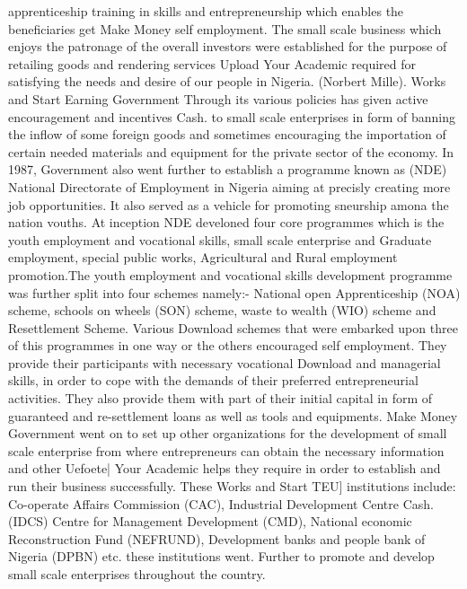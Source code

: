 \documentclass{article}
\begin{document}
apprenticeship training in skills and entrepreneurship which enables the beneficiaries get Make Money
self employment. The small scale business which enjoys the patronage of the overall investors were established for the purpose of retailing goods and rendering services Upload Your Academic
required for satisfying the needs and desire of our people in Nigeria. (Norbert Mille). Works and Start Earning
Government Through its various policies has given active encouragement and incentives Cash.
to small scale enterprises in form of banning the inflow of some foreign goods and
sometimes encouraging the importation of certain needed materials and equipment for the
private sector of the economy. In 1987, Government also went further to establish a
programme known as (NDE) National Directorate of Employment in Nigeria aiming at
precisly creating more job opportunities. It also served as a vehicle for promoting
sneurship amona the nation vouths. At inception NDE develoned four core 
programmes which is the youth employment and vocational skills, small scale enterprise
and Graduate employment, special public works, Agricultural and Rural employment
promotion.The youth employment and vocational skills development programme was further split
into four schemes namely:- National open Apprenticeship (NOA) scheme, schools on
wheels (SON) scheme, waste to wealth (WIO) scheme and Resettlement Scheme. Various Download
schemes that were embarked upon three of this programmes in one way or the others
encouraged self employment. They provide their participants with necessary vocational Download
and managerial skills, in order to cope with the demands of their preferred entrepreneurial
activities. They also provide them with part of their initial capital in form of guaranteed
and re-settlement loans as well as tools and equipments. Make Money
Government went on to set up other organizations for the development of small scale
enterprise from where entrepreneurs can obtain the necessary information and other Uefoete| Your Academic
helps they require in order to establish and run their business successfully. These Works and Start TEU]
institutions include: Co-operate Affairs Commission (CAC), Industrial Development Centre Cash.
(IDCS) Centre for Management Development (CMD), National economic Reconstruction
Fund (NEFRUND), Development banks and people bank of Nigeria (DPBN) etc. these
institutions went. Further to promote and develop small scale enterprises throughout the country.
\end{document}
